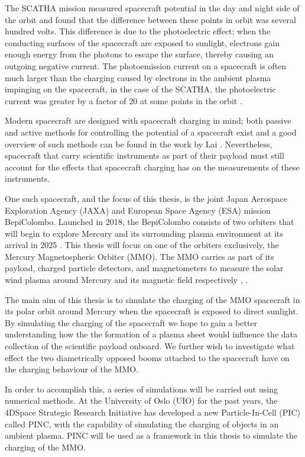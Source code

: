 The SCATHA mission measured spacecraft potential in the day and night side of the orbit
and found that the difference between these points in orbit was several hundred volts\parencite{Mullen1986}. This difference is due to the photoelectric effect; when the conducting surfaces of the spacecraft are exposed to sunlight, electrons gain enough energy from the photons to escape the surface, thereby causing an outgoing negative current. The photoemission current on a spacecraft is often much larger than the charging caused by electrons in the ambient plasma impinging on the spacecraft, in the case of the SCATHA, the photoelectric current was greater by a factor of 20 at some points in the orbit \parencite{LAI2019}.  

Modern spacecraft are designed with spacecraft charging in mind; both passive and active methods for controlling the potential of a spacecraft exist and a good overview of such methods can be found in the work by Lai \parencite{Lai2003}. Nevertheless, spacecraft that carry scientific instruments as part of their payload must still account for the effects that spacecraft charging has on the measurements of these instruments. 

One such spacecraft, and the focus of this thesis, is the joint Japan Aerospace Exploration Agency (JAXA) and European Space Agency (ESA) mission BepiColombo. Launched in 2018, the BepiColombo consists of two orbiters that will begin to explore Mercury and its surrounding plasma environment at its arrival in 2025 \parencite{Benkhoff2009}. This thesis will focus on one of the orbiters exclusively, the Mercury Magnetospheric Orbiter (MMO). The MMO carries as part of its payload, charged particle detectors, and magnetometers to measure the solar wind plasma around Mercury and its magnetic field respectively \parencite{Saito2010}, \parencite{Benkhoff2009}. 

The main aim of this thesis is to simulate the charging of the MMO spacecraft in its polar orbit around Mercury when the spacecraft is exposed to direct sunlight. By simulating the charging of the spacecraft we hope to gain a better understanding how the the formation of a plasma sheet would influence the data collection of the scientific payload onboard. We further wish to investigate what effect the two diametrically opposed booms attached to the spacecraft have on the charging behaviour of the MMO.  

In order to accomplish this, a series of simulations will be carried out using numerical methods. At the University of Oslo (UIO) for the past years, the 4DSpace Strategic Research Initiative has developed a new Particle-In-Cell (PIC) called PINC, with the capability of simulating the charging of objects in an ambient plasma. PINC will be used as a framework in this thesis to simulate the charging of the MMO.

